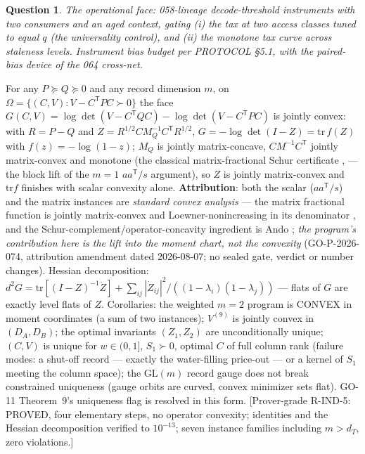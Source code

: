 ﻿\documentclass[11pt]{article}
\newtheorem{question}{Question}
\theoremstyle{remark}
\begin{document}
\begin{question}
The operational face: 058-lineage decode-threshold instruments with
two consumers and an aged context, gating (i) the tax at two access
classes tuned to equal $q$ (the universality control), and (ii) the
monotone tax curve across staleness levels. Instrument bias budget per
PROTOCOL \S5.1, with the paired-bias device of the 064 cross-net.
\end{question}

\begin{theorem}
\label{thm:m2conv}
For any $P\succeq Q\succeq0$ and any record dimension $m$, on
$\Omega=\{(C,V):V-C^{\mathsf T}PC\succ0\}$ the face
$G(C,V)=\log\det(V-C^{\mathsf T}QC)-\log\det(V-C^{\mathsf T}PC)$ is
jointly convex: with $R=P-Q$ and
$Z=R^{1/2}CM_Q^{-1}C^{\mathsf T}R^{1/2}$,
$G=-\log\det(I-Z)=\mathrm{tr}\,f(Z)$ with $f(z)=-\log(1-z)$; $M_Q$ is
jointly matrix-concave, $CM^{-1}C^{\mathsf T}$ jointly matrix-convex
and monotone (the classical matrix-fractional Schur certificate
\cite[Sec.~3.1.7 and 3.2.4]{bib:bv04},\cite{bib:ando79} ---
the block lift of the $m{=}1$ $aa^{\mathsf T}\!/s$ argument), so $Z$
is jointly matrix-convex and $\mathrm{tr}f$ finishes with scalar
convexity alone. \textbf{Attribution}: both the scalar
($aa^{\mathsf T}\!/s$) and the matrix instances are \emph{standard
convex analysis} --- the matrix fractional function is jointly
matrix-convex and Loewner-nonincreasing in its denominator
\cite[Sec.~3.1.7 and 3.2.4]{bib:bv04}, and the
Schur-complement/operator-concavity ingredient is Ando
\cite{bib:ando79}; \emph{the program's contribution here is the lift
into the moment chart, not the convexity} (GO-P-2026-074, attribution
amendment dated 2026-08-07; no sealed gate, verdict or number
changes). Hessian decomposition: $d^2G=\mathrm{tr}[(I-Z)^{-1}
\ddot Z]+\sum_{ij}|\dot Z_{ij}|^2/((1-\lambda_i)(1-\lambda_j))$ ---
flats of $G$ are exactly level flats of $Z$. Corollaries: the
weighted $m{=}2$ program is CONVEX in moment coordinates (a sum of
two instances); $V^{(9)}$ is jointly convex in $(D_A,D_B)$; the
optimal invariants $(Z_1,Z_2)$ are unconditionally unique; $(C,V)$ is
unique for $w\in(0,1]$, $S_1\succ0$, optimal $C$ of full column rank
(failure modes: a shut-off record --- exactly the water-filling
price-out --- or a kernel of $S_1$ meeting the column space); the
GL$(m)$ record gauge does not break constrained uniqueness (gauge
orbits are curved, convex minimizer sets flat). GO-11 Theorem~9's
uniqueness flag is resolved in this form. [Prover-grade R-IND-5:
PROVED, four elementary steps, no operator convexity; identities and
the Hessian decomposition verified to $10^{-13}$; seven instance
families including $m>d_T$, zero violations.]
\end{theorem}
\end{document}

